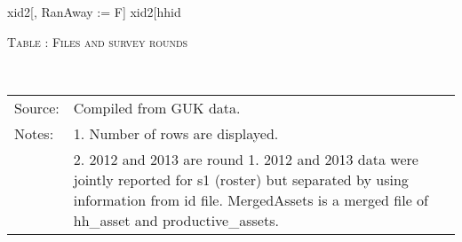 \begin{Schunk}
\begin{Sinput}
xid2[, RanAway := F]
xid2[hhid %in% attritedHH & grepl("^old", Mstatus), RanAway := T]
\end{Sinput}
\end{Schunk}




\begin{table}
\hfil\textsc{\footnotesize Table \thetable: Files and survey rounds\label{filestab}}\\
\setlength{\tabcolsep}{1pt}
\renewcommand{\arraystretch}{.75}
\hfil{}\\
\renewcommand{\arraystretch}{1}
\hfil\begin{tabular}{>{\hfill\scriptsize}p{1cm}<{}>{\scriptsize}p{12cm}<{\hfill}}
Source:& Compiled from GUK data.\\[-1ex]
Notes:& 1. Number of rows are displayed.\\[-1ex]
& 2. 2012 and 2013 are round 1. 2012 and 2013 data were jointly reported for \textsf{s1 (roster)} but separated by using information from \textsf{id} file. \textsf{MergedAssets} is a merged file of \textsf{hh\_asset} and \textsf{productive\_assets}. \\[-1ex]
\end{tabular}
\end{table}


